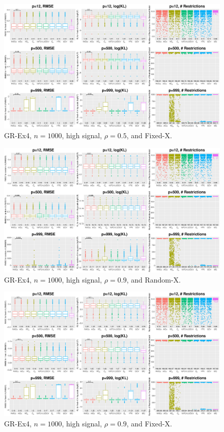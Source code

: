 \begin{figure}[!ht]
\centering
\includegraphics[width=\textwidth]{figures/supplement/fixedx_GR-Ex4_n1000_hsnr_rho05.eps}
\caption{GR-Ex4, $n=1000$, high signal, $\rho=0.5$, and Fixed-X.}
\end{figure}
\clearpage
\begin{figure}[!ht]
\centering
\includegraphics[width=\textwidth]{figures/supplement/randomx_GR-Ex4_n1000_hsnr_rho09.eps}
\caption{GR-Ex4, $n=1000$, high signal, $\rho=0.9$, and Random-X.}
\end{figure}
\begin{figure}[!ht]
\centering
\includegraphics[width=\textwidth]{figures/supplement/fixedx_GR-Ex4_n1000_hsnr_rho09.eps}
\caption{GR-Ex4, $n=1000$, high signal, $\rho=0.9$, and Fixed-X.}
\end{figure}
